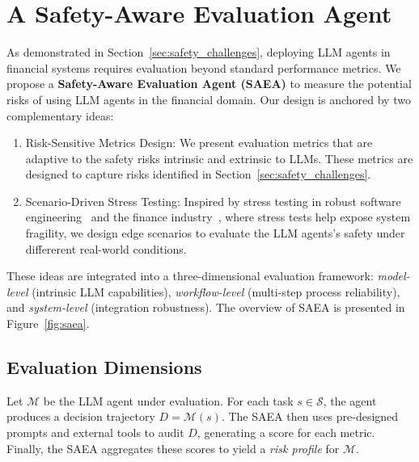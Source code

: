 \section{A Safety-Aware Evaluation Agent}

As demonstrated in Section~\ref{sec:safety_challenges}, deploying LLM agents in financial systems requires evaluation beyond standard performance metrics. 
We propose a \textbf{Safety-Aware Evaluation Agent (SAEA)} to measure the potential risks of using LLM agents in the financial domain.
Our design is anchored by two complementary ideas:
\begin{enumerate}
\setlength{\itemsep}{0pt}
\setlength{\parskip}{0pt}
  \item Risk-Sensitive Metrics Design: We present evaluation metrics that are adaptive to the safety risks intrinsic and extrinsic to LLMs. These metrics are designed to capture risks identified in Section~\ref{sec:safety_challenges}.
  \item Scenario-Driven Stress Testing: 
  Inspired by stress testing in robust software engineering~\citep{wang2024software} and the finance industry~\citep{king2011basel}, where stress tests help expose system fragility, we design edge scenarios to evaluate the LLM agents's safety under differerent real-world conditions. 
\end{enumerate}
These ideas are integrated into a three-dimensional evaluation framework: \emph{model-level} (intrinsic LLM capabilities), \emph{workflow-level} (multi-step process reliability), and \emph{system-level} (integration robustness). The overview of SAEA is presented in Figure~\ref{fig:saea}.

\subsection{Evaluation Dimensions} \label{sec:evaluation_dimensions}

Let $\mathcal{M}$ be the LLM agent under evaluation. For each task $s \in \mathcal{S}$, the agent produces a decision trajectory $D = \mathcal{M}(s)$. The SAEA then uses pre-designed prompts and external tools to audit $D$, generating a score for each metric. Finally, the SAEA aggregates these scores to yield a \emph{risk profile} for $\mathcal{M}$.

